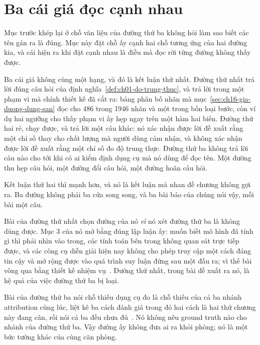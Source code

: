 \section{Ba cái giá đọc cạnh nhau}
\label{sec:ch16-ba-cai-gia}

%
Mục trước khép lại ở chỗ văn liệu của đường thứ ba không hỏi làm sao biết các
tên gán ra là đúng. Mục này đặt chỗ ấy cạnh hai chỗ tương ứng của hai đường kia,
và cái hiện ra khi đặt cạnh nhau là điều mà đọc rời từng đường không thấy được.

%
Ba cái giá không cùng một hạng, và đó là kết luận thứ nhất. Đường thứ nhất trả
lời đúng câu hỏi của định nghĩa~\ref{def:ch01-do-trung-thuc}, và trả lời trong
một phạm vi mà chính thiết kế đã cắt ra: bảng phân bố nhãn mà
mục~\ref{sec:ch16-gia-duong-dung-san} đọc cho 486 trong 1946 nhãn và một trong
bốn loại bước, còn ví dụ hai ngưỡng cho thấy phạm vi ấy hẹp ngay trên một hàm
hai biến. Đường thứ hai rẻ, chạy được, và trả lời một câu khác: nó xác nhận được lời
đề xuất rằng một chỉ số thay cho chất lượng mà người dùng cảm nhận, và không xác
nhận được lời đề xuất rằng một chỉ số đo độ trung thực. Đường thứ ba không trả
lời câu nào cho tới khi có ai kiểm định dụng cụ mà nó dùng để đọc tên. Một đường
thu hẹp câu hỏi, một đường đổi câu hỏi, một đường hoãn câu hỏi.

%
Kết luận thứ hai thì mạnh hơn, và nó là kết luận mà nhan đề chương không gợi ra.
Ba đường không phải ba cửa song song, và ba bài báo của chúng nói vậy, mỗi bài
một câu.

Bài của đường thứ nhất chọn đường của nó \emph{vì} nó xét đường thứ ba là không
dùng được. Mục 3 của nó mở bằng đúng lập luận ấy: muốn biết mô hình đã tính gì
thì phải nhìn vào trong, các tính toán bên trong không quan sát trực tiếp được,
và các công cụ diễn giải hiện nay không cho phép truy cập một cách đáng tin cậy
và mở rộng được vào quá trình suy luận đứng sau một đầu ra; vì thế bài vòng qua
bằng thiết kế nhiệm vụ~\autocite{p21metrics}. Đường thứ nhất, trong bài đề xuất
ra nó, là hệ quả của việc đường thứ ba bị loại.

Bài của đường thứ ba nói chỗ thiếu dụng cụ đo là chỗ thiếu của cả ba nhánh
attribution cùng lúc, liệt kê ba cách đánh giá trong đó hai cách là hai thứ
chương này đang cân, rồi nói cả ba đều chưa đủ~\autocite{p18unified}. Nó không
nêu ground truth nào cho nhánh của đường thứ ba. Vậy đường ấy không đưa ai ra
khỏi phòng; nó là một bức tường khác của cùng căn phòng.

